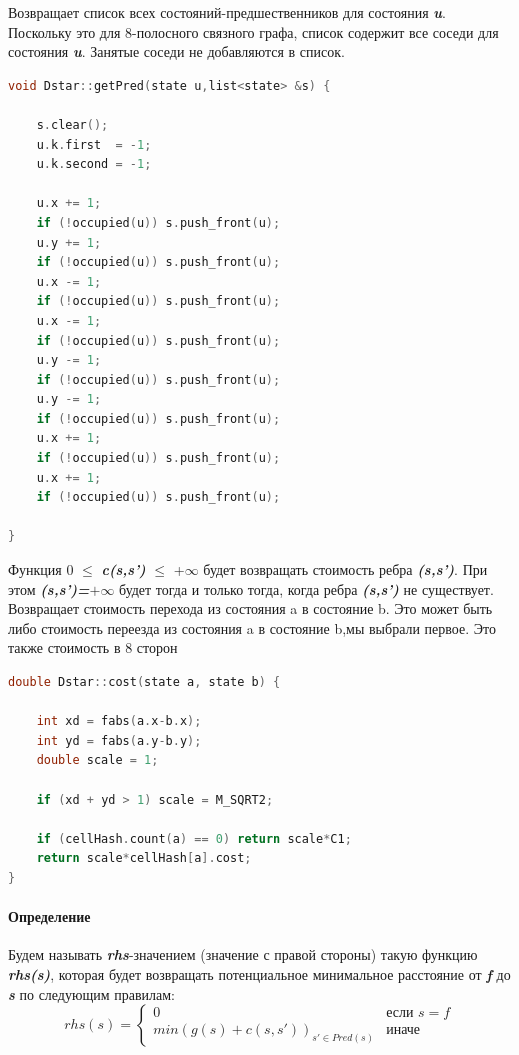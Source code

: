 \documentclass[12pt]{article}
\begin{document}
\newpage
Возвращает список всех состояний-предшественников для состояния \textbf{\emph{u}}.
Поскольку это для 8-полосного связного графа, список содержит все соседи для состояния \textbf{\emph{u}}. Занятые соседи не добавляются в список.
\begin{lstlisting}[language=C,style=C]
void Dstar::getPred(state u,list<state> &s) {

    s.clear();
    u.k.first  = -1;
    u.k.second = -1;

    u.x += 1;
    if (!occupied(u)) s.push_front(u);
    u.y += 1;
    if (!occupied(u)) s.push_front(u);
    u.x -= 1;
    if (!occupied(u)) s.push_front(u);
    u.x -= 1;
    if (!occupied(u)) s.push_front(u);
    u.y -= 1;
    if (!occupied(u)) s.push_front(u);
    u.y -= 1;
    if (!occupied(u)) s.push_front(u);
    u.x += 1;
    if (!occupied(u)) s.push_front(u);
    u.x += 1;
    if (!occupied(u)) s.push_front(u);

}
\end{lstlisting}
Функция  0 $\leq$ \textbf{\emph{c(s,s') }} $\leq$ +$\infty$ будет возвращать стоимость ребра \textbf{\emph{(s,s')}}. При этом \textbf{\emph{(s,s')=}}$+\infty$ будет тогда и только тогда, когда ребра \textbf{\emph{(s,s')}} не существует.\\
Возвращает стоимость перехода из состояния a в состояние b. Это может быть либо стоимость переезда из состояния a  в состояние b,мы выбрали первое.
Это также стоимость в 8 сторон
\begin{lstlisting}[language=C,style=C]
double Dstar::cost(state a, state b) {

    int xd = fabs(a.x-b.x);
    int yd = fabs(a.y-b.y);
    double scale = 1;

    if (xd + yd > 1) scale = M_SQRT2;

    if (cellHash.count(a) == 0) return scale*C1;
    return scale*cellHash[a].cost;
}
\end{lstlisting}

\newpage

\paragraph{Определение}
Будем называть \textbf{\emph{rhs}}-значением (значение с правой стороны) такую функцию \textbf{\emph{rhs(s)}}, которая будет возвращать потенциальное минимальное расстояние от \textbf{\emph{f}} до \textbf{\emph{s}} по следующим правилам:
\begin{displaymath}
rhs(s) = \left\{ \begin{array}{ll}
 0 & \textrm{если $s=f$}\\
 min(g(s)+c(s,s'))_{s'\in Pred(s)} & \textrm{иначе}
  \end{array} \right.
\end{displaymath}
\end{document}
